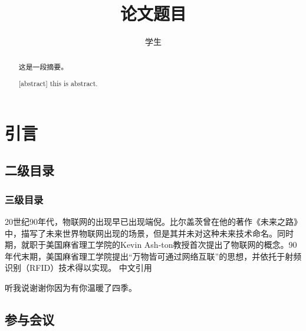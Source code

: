 \documentclass[]{GZUthesis}
\author{学生}
\title{论文题目}
\begin{document}
\maketitle
\frontmatter
\begin{abstract}
    这是一段摘要。
\end{abstract}
\newpage
\begin{abstract}[abstract]
    this is abstract.
\end{abstract}
\newpage
\tableofcontents
\newpage
\mainmatter
\section{引言}
\subsection{二级目录}
\subsubsection{三级目录}
20世纪90年代，物联网的出现早已出现端倪。比尔盖茨曾在他的著作《未来之路》中，描写了未来世界物联网出现的场景，但是其并未对这种未来技术命名。\cite{gates1995road}同时期，就职于美国麻省理工学院的Kevin Ash-ton教授首次提出了物联网的概念。90年代末期，美国麻省理工学院提出“万物皆可通过网络互联”的思想，并依托于射频识别（RFID）技术得以实现。
中文引用\cite{孙其博2010物联网}



\begin{thank}
    听我说谢谢你因为有你温暖了四季。
\end{thank}
\printbibliography

\begin{appendices}
    \section{参与会议}
\end{appendices}
\promise
\end{document}
